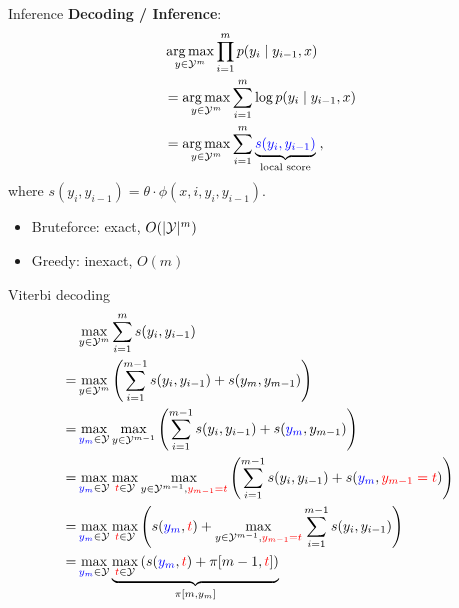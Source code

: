 \documentclass[usenames,dvipsnames,notes]{beamer}
\begin{document}
\begin{frame}
    {Inference}
    \textbf{Decoding / Inference}:
    \begin{align*}
        & \operatorname*{arg\,max}_{y\in\mathcal{Y}^m} \prod_{i=1}^m p(y_i\mid y_{i-1}, x) \\
        &= \operatorname*{arg\,max}_{y\in\mathcal{Y}^m} \sum_{i=1}^m \log p(y_i\mid y_{i-1}, x) \\
        &= \operatorname*{arg\,max}_{y\in\mathcal{Y}^m} \sum_{i=1}^m \underbrace{{\color{blue}s(y_i,y_{i-1})}}_{\text{local score}} \;,
    \end{align*}
    where $s(y_i,y_{i-1}) = \theta\cdot\phi(x,i,y_i,y_{i-1})$.

    \begin{itemize}
        \item Bruteforce: exact, $O(|\mathcal{Y}|^m)$
        \item Greedy: inexact, $O(m)$
    \end{itemize}
\end{frame}

\begin{frame}
    {Viterbi decoding}
    \vspace{-1em}
    \begin{align*}
        & \max_{y\in\mathcal{Y}^m} \sum_{i=1}^m s(y_i,y_{i-1}) \\
        = & \max_{y\in\mathcal{Y}^m} \left(  \sum_{i=1}^{m-1}s(y_i, y_{i-1}) + s(y_m, y_{m-1})  \right) \\
        = &\max_{{\color{blue}y_m}\in\mathcal{Y}} \max_{y\in\mathcal{Y}^{m-1}}
            \left(  \sum_{i=1}^{m-1}s(y_i, y_{i-1}) + s({\color{blue}y_m}, y_{m-1})  \right) \\
        = &\max_{{\color{blue}y_m}\in\mathcal{Y}} \max_{{\color{red}t}\in\mathcal{Y}} \max_{y\in\mathcal{Y}^{m-1},{\color{red}y_{m-1}=t}}
            \left(  \sum_{i=1}^{m-1}s(y_i, y_{i-1}) + s({\color{blue}y_m}, {\color{red}y_{m-1}=t})  \right) \\
        = & \max_{{\color{blue}y_m}\in\mathcal{Y}} \max_{{\color{red}t}\in\mathcal{Y}}
        \left(  s({\color{blue}y_m}, {\color{red}t}) + 
        \max_{y\in\mathcal{Y}^{m-1},{\color{red}y_{m-1}=t}}
        \sum_{i=1}^{m-1}s(y_i, y_{i-1})  \right) \\
        = & \max_{{\color{blue}y_m}\in\mathcal{Y}} \underbrace{
            \max_{{\color{red}t}\in\mathcal{Y}}
        \left(  s({\color{blue}y_m}, {\color{red}t}) + \pi[m-1, {\color{red}t}] 
         \right)}_{\pi[m, y_m]}
    \end{align*}
\end{frame}
\end{document}
